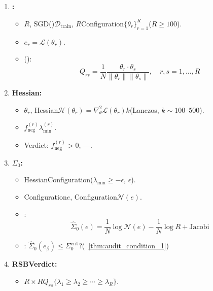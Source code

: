 \documentclass[12pt,a4paper]{article}
\theoremstyle{remark}
\newcommand{\loss}{\mathcal{L}}
\newcommand{\D}{\mathcal{D}}
\begin{document}
\subsection{}
\begin{enumerate}[label=\textbf{ \arabic*},leftmargin=*,itemsep=8pt]
    \item \textbf{: }
    \begin{itemize}[itemsep=2pt]
        \item $R$, SGD()$\D_{\text{train}}$, $R$Configuration$\{\theta_r\}_{r=1}^{R}$($R \geq 100$).
        \item $e_r = \loss(\theta_r)$.
        \item (): 
        \begin{equation}
            Q_{rs} = \frac{1}{N} \frac{\theta_r \cdot \theta_s}{\|\theta_r\| \|\theta_s\|}, \quad r,s = 1,\ldots,R
        \end{equation}
    \end{itemize}
    \item \textbf{Hessian: }
    \begin{itemize}[itemsep=2pt]
        \item $\theta_r$, Hessian$\mathcal{H}(\theta_r) = \nabla^2_\theta \loss(\theta_r)$$k$(Lanczos, $k \sim 100\text{--}500$).
        \item $f_{\text{neg}}^{(r)}$$\lambda_{\min}^{(r)}$.
        \item Verdict: $f_{\text{neg}}^{(r)} > 0$, ---.
    \end{itemize}
    \item \textbf{$\Sigma_0$: }
    \begin{itemize}[itemsep=2pt]
        \item HessianConfiguration($\lambda_{\min} \geq -\epsilon$, $\epsilon$).
        \item Configuration$e$, Configuration$\mathcal{N}(e)$.
        \item : 
        \begin{equation}
            \hat{\Sigma}_0(e) = \frac{1}{N} \log \mathcal{N}(e) - \frac{1}{N} \log R + \text{Jacobi}
        \end{equation}
        \item : $\hat{\Sigma}_0(e_\beta) \leq \Sigma_0^{\text{crit}}$?(~\ref{thm:audit_condition_1})
    \end{itemize}
    \item \textbf{RSBVerdict: }
    \begin{itemize}[itemsep=2pt]
        \item $R \times R$$Q_{rs}$$\{\lambda_1 \geq \lambda_2 \geq \cdots \geq \lambda_R\}$.

\end{itemize}
\end{enumerate}
\end{document}
